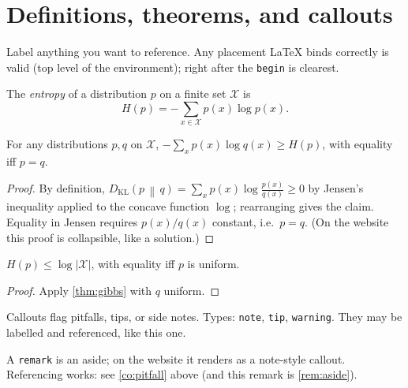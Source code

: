 \documentclass[11pt]{article}
\newcommand{\KL}[2]{D_{\mathrm{KL}}\!\left(#1 \,\middle\|\, #2\right)}
\begin{document}
\section{Definitions, theorems, and callouts}
\label{sec:results}

Label anything you want to reference. Any placement \LaTeX{} binds correctly
is valid (top level of the environment); right after the \texttt{begin} is
clearest.

\begin{definition}[entropy]
\label{def:entropy}
The \emph{entropy} of a distribution $p$ on a finite set $\mathcal{X}$ is
\[ H(p) = -\sum_{x \in \mathcal{X}} p(x) \log p(x). \]
\end{definition}

\begin{theorem}
\label{thm:gibbs}
For any distributions $p, q$ on $\mathcal{X}$,
$-\sum_x p(x) \log q(x) \geq H(p)$, with equality iff $p = q$.
\end{theorem}

\begin{proof}
By definition, $\KL{p}{q} = \sum_x p(x) \log \frac{p(x)}{q(x)} \geq 0$ by
Jensen's inequality applied to the concave function $\log$; rearranging gives
the claim. Equality in Jensen requires $p(x)/q(x)$ constant, i.e.\ $p = q$.
(On the website this proof is collapsible, like a solution.)
\end{proof}

\begin{lemma}
\label{lem:uniform}
$H(p) \leq \log |\mathcal{X}|$, with equality iff $p$ is uniform.
\end{lemma}

\begin{proof}
Apply \cref{thm:gibbs} with $q$ uniform.
\end{proof}

\begin{callout}[warning]
\label{co:pitfall}
Callouts flag pitfalls, tips, or side notes. Types: \texttt{note},
\texttt{tip}, \texttt{warning}. They may be labelled and referenced,
like this one.
\end{callout}

\begin{remark}
\label{rem:aside}
A \texttt{remark} is an aside; on the website it renders as a note-style
callout. Referencing works: see \cref{co:pitfall} above (and this remark is
\cref{rem:aside}).
\end{remark}
\end{document}
